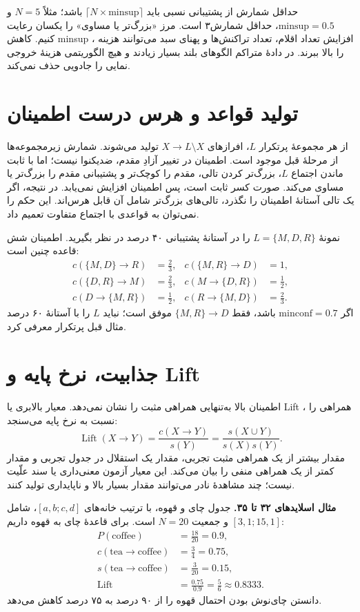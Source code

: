 حداقل شمارش از پشتیبانی نسبی باید $\lceil N\times\mathrm{minsup}\rceil$ باشد؛ مثلاً $N=5$ و $\mathrm{minsup}=0.5$، حداقل شمارش۳ است. مرز «بزرگ‌تر یا مساوی» را یکسان رعایت کنیم. کاهش minsup ، افزایش تعداد اقلام، تعداد تراکنش‌ها و پهنای سبد می‌توانند هزینه را بالا ببرند. در دادهٔ متراکم الگوهای بلند بسیار زیادند و هیچ الگوریتمی هزینهٔ خروجی نمایی را جادویی حذف نمی‌کند.

\section{تولید قواعد و هرس درست اطمینان}

از هر مجموعهٔ پرتکرار $L$، افرازهای $X\to L\setminus X$ تولید می‌شوند. شمارش زیرمجموعه‌ها از مرحلهٔ قبل موجود است. اطمینان در تغییر آزادِ مقدم، ضدیکنوا نیست؛ اما با ثابت ماندن اجتماع $L$، بزرگ‌تر کردن تالی، مقدم را کوچک‌تر و پشتیبانی مقدم را بزرگ‌تر یا مساوی می‌کند. صورت کسر ثابت است، پس اطمینان افزایش نمی‌یابد. در نتیجه، اگر یک تالی آستانهٔ اطمینان را نگذرد، تالی‌های بزرگ‌تر شامل آن قابل هرس‌اند. این حکم را نمی‌توان به قواعدی با اجتماع متفاوت تعمیم داد.

نمونهٔ $L=\{M,D,R\}$ را در آستانهٔ پشتیبانی ۴۰ درصد در نظر بگیرید. اطمینان شش قاعده چنین است:
\begin{align*}
c(\{M,D\}\to R)&=\frac23,& c(\{M,R\}\to D)&=1,\\
c(\{D,R\}\to M)&=\frac23,& c(M\to\{D,R\})&=\frac12,\\
c(D\to\{M,R\})&=\frac12,& c(R\to\{M,D\})&=\frac23.
\end{align*}
اگر $\mathrm{minconf}=0.7$ باشد، فقط $\{M,R\}\to D$ موفق است؛ نباید $L$ را با آستانهٔ ۶۰ درصد مثال قبل پرتکرار معرفی کرد.

\section{جذابیت، نرخ پایه و Lift}

اطمینان بالا به‌تنهایی همراهی مثبت را نشان نمی‌دهد. معیار بالابری یا Lift ، همراهی را نسبت به نرخ پایه می‌سنجد:
\[\operatorname{Lift}(X\to Y)=\frac{c(X\to Y)}{s(Y)}=\frac{s(X\cup Y)}{s(X)s(Y)}.\]
مقدار بیشتر از یک همراهی مثبت تجربی، مقدار یک استقلال در جدول تجربی و مقدار کمتر از یک همراهی منفی را بیان می‌کند. این معیار آزمون معنی‌داری یا سند علّیت نیست؛ چند مشاهدهٔ نادر می‌توانند مقدار بسیار بالا و ناپایداری تولید کنند.

\textbf{مثال اسلایدهای ۳۲ تا ۳۵.} جدول چای و قهوه، با ترتیب خانه‌های $[a,b;c,d]$، شامل $[3,1;15,1]$ و جمعیت $N=20$ است. برای قاعدهٔ چای به قهوه داریم:
\begin{align*}
P(\mathrm{coffee})&=\frac{18}{20}=0.9,\\
c(\mathrm{tea}\to\mathrm{coffee})&=\frac34=0.75,\\
s(\mathrm{tea}\to\mathrm{coffee})&=\frac3{20}=0.15,\\
\operatorname{Lift}&=\frac{0.75}{0.9}=\frac56\approx0.8333.
\end{align*}
دانستن چای‌نوش بودن احتمال قهوه را از ۹۰ درصد به ۷۵ درصد کاهش می‌دهد.

